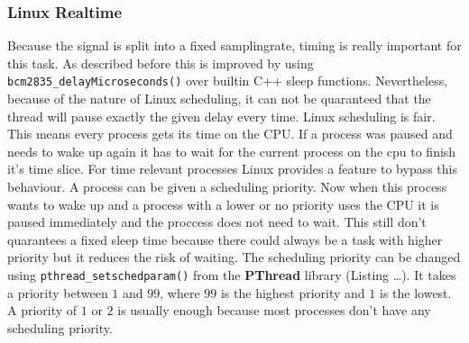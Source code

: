 \subsubsection*{Linux Realtime}

Because the signal is split into a fixed samplingrate, timing is really important for this task. As described before this is improved by using \lstinline{bcm2835_delayMicroseconds()} over builtin C++ sleep functions. Nevertheless, because of the nature of Linux scheduling, it can not be quaranteed that the thread will pause exactly the given delay every time. Linux scheduling is fair. This means every process gets its time on the CPU. If a process was paused and needs to wake up again it has to wait for the current process on the cpu to finish it's time slice. For time relevant processes Linux provides a feature to bypass this behaviour. A process can be given a scheduling priority. Now when this process wants to wake up and a process with a lower or no priority uses the CPU it is paused immediately and the proccess does not need to wait. This still don't quarantees a fixed sleep time because there could always be a task with higher priority but it reduces the risk of waiting.\p
%
The scheduling priority can be changed using \lstinline{pthread_setschedparam()} from the \textbf{PThread} library (Listing \dots). It takes a priority between $1$ and $99$, where $99$ is the highest priority and $1$ is the lowest. A priority of $1$ or $2$ is usually enough because most processes don't have any scheduling priority.